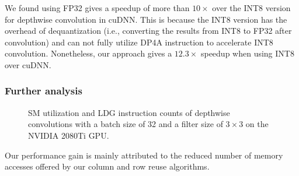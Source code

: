  We found using FP32 gives a speedup of more than $10\times$ over the INT8 version for depthwise convolution
in cuDNN. This is because the INT8 version has the overhead of dequantization (i.e., converting the results from INT8 to FP32 after
convolution) and can not fully utilize DP4A instruction to accelerate INT8 convolution. Nonetheless, our approach gives a $12.3\times$
speedup when using INT8 over cuDNN.


\subsubsection{Further analysis}
\begin{figure}[t!]
    \centering
    \qquad
    \vspace{-2mm}
    \caption{SM utilization and LDG instruction counts of depthwise convolutions with a batch size of 32 and a filter size of $3\times3$ on the NVIDIA 2080Ti GPU.}
    \label{fig:dwratio}
\end{figure}
Our performance gain is mainly attributed to the reduced number of memory accesses offered by our column and row reuse algorithms.

